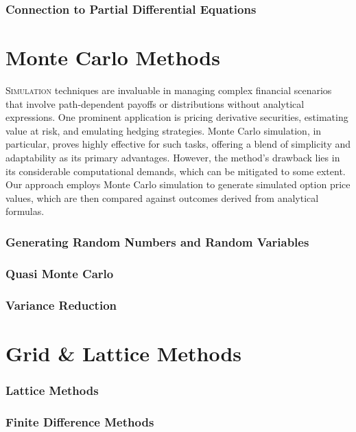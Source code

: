 \documentclass[12pt, a4paper]{article}
\begin{document}
\section{Connection to Partial Differential Equations}
%

\part{Monte Carlo Methods}
\lettrine[lines=2, lhang=0.1]{S}{imulation} techniques are invaluable in managing complex financial scenarios that involve path-dependent payoffs or distributions without analytical expressions. One prominent application is pricing derivative securities, estimating value at risk, and emulating hedging strategies. Monte Carlo simulation, in particular, proves highly effective for such tasks, offering a blend of simplicity and adaptability as its primary advantages. However, the method's drawback lies in its considerable computational demands, which can be mitigated to some extent. Our approach employs Monte Carlo simulation to generate simulated option price values, which are then compared against outcomes derived from analytical formulas.
\section{Generating Random Numbers and Random Variables}
%

\section{Quasi Monte Carlo}



\section{Variance Reduction}
%

\part{Grid \& Lattice Methods}

\section{Lattice Methods}
%

\section{Finite Difference Methods}
\end{document}
